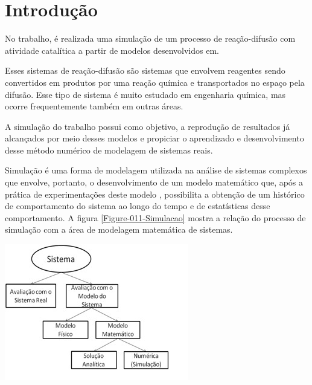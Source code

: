 
\section{Introdução}

No trabalho, é realizada uma simulação de um processo de reação-difusão com
atividade catalítica a partir de modelos desenvolvidos em\cite{3}.

Esses sistemas de reação-difusão são sistemas que envolvem reagentes sendo
convertidos em produtos por uma reação química e transportados no espaço pela
difusão. Esse tipo de sistema é muito estudado em engenharia química, mas ocorre
frequentemente também em outras áreas\cite{4}.

A simulação do trabalho possui como objetivo, a reprodução de resultados já
alcançados por meio desses modelos e propiciar o aprendizado e desenvolvimento
desse método numérico de modelagem de sistemas reais.

Simulação é uma forma de modelagem utilizada na análise de sistemas complexos
que envolve, portanto, o desenvolvimento de um modelo matemático que, após a
prática de experimentações deste modelo , possibilita a obtenção de um histórico
de comportamento do sistema ao longo do tempo e de estatísticas desse
comportamento\cite{1}. A figura \ref{Figure-011-Simulacao} mostra a relação do
processo de simulação com a área de modelagem matemática de sistemas.

{ \centering
	\hfill \break
	\captionsetup{type=figure}
	\includegraphics[width=\columnwidth]{./figures/011-Simulacao.jpg}
	\label{Figure-011-Simulacao}
}

